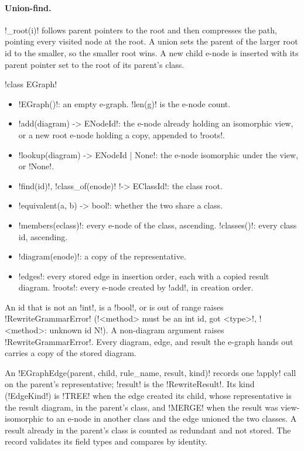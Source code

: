 \paragraph{Union-find.}
\py!_root(i)! follows parent pointers to the root and then compresses the path, pointing every
visited node at the root. A union sets the parent of the larger root id to the smaller, so the
smaller root wins. A new child e-node is inserted with its parent pointer set to the root of its
parent's class.

\begin{signature}
\py!class EGraph!
\end{signature}
\begin{itemize}
\item \py!EGraph()!: an empty e-graph. \py!len(g)! is the e-node count.
\item \py!add(diagram) -> ENodeId!: the e-node already holding an isomorphic view, or a new root
  e-node holding a copy, appended to \py!roots!.
\item \py!lookup(diagram) -> ENodeId | None!: the e-node isomorphic under the view, or \py!None!.
\item \py!find(id)!, \py!class_of(enode)! \py!-> EClassId!: the class root.
\item \py!equivalent(a, b) -> bool!: whether the two share a class.
\item \py!members(eclass)!: every e-node of the class, ascending. \py!classes()!: every class id,
  ascending.
\item \py!diagram(enode)!: a copy of the representative.
\item \py!edges!: every stored edge in insertion order, each with a copied result diagram.
  \py!roots!: every e-node created by \py!add!, in creation order.
\end{itemize}
An id that is not an \py!int!, is a \py!bool!, or is out of range raises \py!RewriteGrammarError!
(\code!<method> must be an int id, got <type>!, \code!<method>: unknown id N!). A non-diagram
argument raises \py!RewriteGrammarError!. Every diagram, edge, and result the e-graph hands out
carries a copy of the stored diagram.

\begin{definition}[Edge]\label{def:rewriting-edge}
An \py!EGraphEdge(parent, child, rule_name, result, kind)! records one \py!apply! call on the
parent's representative; \py!result! is the \py!RewriteResult!. Its kind (\py!EdgeKind!) is
\code!TREE! when the edge created its child, whose representative is the result diagram, in the
parent's class, and \code!MERGE! when the result was view-isomorphic to an e-node in another class
and the edge unioned the two classes. A result already in the parent's class is counted as
redundant and not stored. The record validates its field types and compares by identity.
\end{definition}

